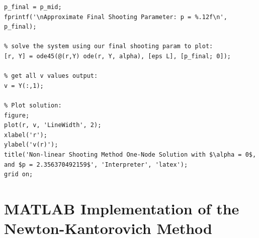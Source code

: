 \documentclass[12pt]{article}
\begin{document}
\begin{lstlisting}[caption={MATLAB implementation of the shooting method with bisection update for the parameter \(p\).}, label={lst:shooting}]
% set the final shooting param: 
p_final = p_mid;
fprintf('\nApproximate Final Shooting Parameter: p = %.12f\n', p_final);

% solve the system using our final shooting param to plot: 
[r, Y] = ode45(@(r,Y) ode(r, Y, alpha), [eps L], [p_final; 0]);

% get all v values output: 
v = Y(:,1);

% Plot solution:
figure;
plot(r, v, 'LineWidth', 2);
xlabel('r');
ylabel('v(r)');
title('Non-linear Shooting Method One-Node Solution with $\alpha = 0$, and $p = 2.356370492159$', 'Interpreter', 'latex');
grid on;
\end{lstlisting}

\section{MATLAB Implementation of the Newton-Kantorovich Method}
\end{document}
